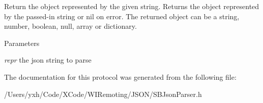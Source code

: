 Return the object represented by the given string. Returns the object represented by the passed-\/in string or nil on error. The returned object can be a string, number, boolean, null, array or dictionary.


\begin{DoxyParams}{Parameters}
\item[{\em repr}]the json string to parse \end{DoxyParams}


The documentation for this protocol was generated from the following file:\begin{DoxyCompactItemize}
\item 
/Users/yxh/Code/XCode/WIRemoting/JSON/SBJsonParser.h\end{DoxyCompactItemize}
